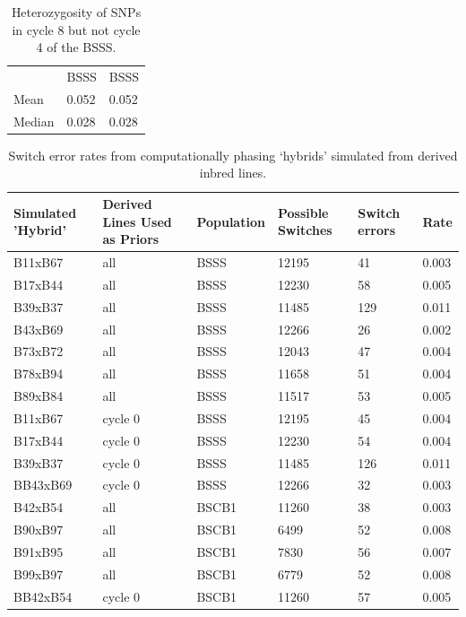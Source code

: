 \begin{table}
\caption{Heterozygosity of SNPs in cycle 8 but not cycle 4 of the BSSS. }
\begin{tabular}{  l | l | l | }
\multicolumn{1}{l}{} & \multicolumn{1}{l}{BSSS} & \multicolumn{1}{l}{BSSS}   \\ \cline{2-3}
	Mean & 0.052 & 0.052   \\ \cline{2-3}
	Median & 0.028 & 0.028   \\ \cline{2-3}
\end{tabular}
\end{table}




\begin{table}
\caption{Switch error rates from computationally phasing ‘hybrids’ simulated from derived inbred lines.}
\begin{tabular}{ | l | l | l | l | l | l | }

\hline
	\textbf{Simulated 'Hybrid'} & \textbf{Derived Lines Used as Priors} & \textbf{Population} & \textbf{Possible Switches} & \textbf{Switch errors} & \textbf{Rate} \\ \hline
	B11xB67 & all & BSSS & 12195 & 41 & 0.003 \\ \hline
	B17xB44 & all & BSSS & 12230 & 58 & 0.005 \\ \hline
	B39xB37 & all & BSSS & 11485 & 129 & 0.011 \\ \hline
	B43xB69 & all & BSSS & 12266 & 26 & 0.002 \\ \hline
	B73xB72 & all & BSSS & 12043 & 47 & 0.004 \\ \hline
	B78xB94 & all & BSSS & 11658 & 51 & 0.004 \\ \hline
	B89xB84 & all & BSSS & 11517 & 53 & 0.005 \\ \hline
	B11xB67 & cycle 0 & BSSS & 12195 & 45 & 0.004 \\ \hline
	B17xB44 & cycle 0 & BSSS & 12230 & 54 & 0.004 \\ \hline
	B39xB37 & cycle 0 & BSSS & 11485 & 126 & 0.011 \\ \hline
	BB43xB69 & cycle 0 & BSSS & 12266 & 32 & 0.003 \\ \hline
	B42xB54 & all & BSCB1 & 11260 & 38 & 0.003 \\ \hline
	B90xB97 & all & BSCB1 & 6499 & 52 & 0.008 \\ \hline
	B91xB95 & all & BSCB1 & 7830 & 56 & 0.007 \\ \hline
	B99xB97 & all & BSCB1 & 6779 & 52 & 0.008 \\ \hline
	BB42xB54 & cycle 0 & BSCB1 & 11260 & 57 & 0.005 \\\hline
\end{tabular}
	\label{tab:s3}  %
\end{table}